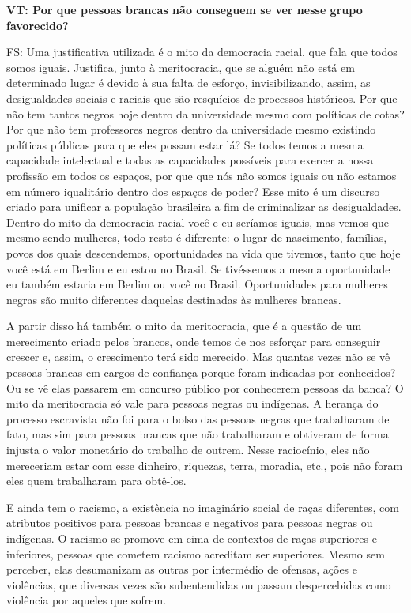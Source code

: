 \documentclass[a4paper,
fontsize=11pt,
oneside,
numbers=noperiodatend,
parskip=half-,
bibliography=totoc,
final
]{scrartcl}
\begin{document}
\textbf{VT: Por que pessoas brancas não conseguem se ver nesse grupo
favorecido?}

FS: Uma justificativa utilizada é o mito da democracia racial, que fala
que todos somos iguais. Justifica, junto à meritocracia, que se alguém
não está em determinado lugar é devido à sua falta de esforço,
invisibilizando, assim, as desigualdades sociais e raciais que são
resquícios de processos históricos. Por que não tem tantos negros hoje
dentro da universidade mesmo com políticas de cotas? Por que não tem
professores negros dentro da universidade mesmo existindo políticas
públicas para que eles possam estar lá? Se todos temos a mesma
capacidade intelectual e todas as capacidades possíveis para exercer a
nossa profissão em todos os espaços, por que que nós não somos iguais ou
não estamos em número iqualitário dentro dos espaços de poder? Esse mito
é um discurso criado para unificar a população brasileira a fim de
criminalizar as desigualdades. Dentro do mito da democracia racial você
e eu seríamos iguais, mas vemos que mesmo sendo mulheres, todo resto é
diferente: o lugar de nascimento, famílias, povos dos quais descendemos,
oportunidades na vida que tivemos, tanto que hoje você está em Berlim e
eu estou no Brasil. Se tivéssemos a mesma oportunidade eu também estaria
em Berlim ou você no Brasil. Oportunidades para mulheres negras são
muito diferentes daquelas destinadas às mulheres brancas.

A partir disso há também o mito da meritocracia, que é a questão de um
merecimento criado pelos brancos, onde temos de nos esforçar para
conseguir crescer e, assim, o crescimento terá sido merecido. Mas
quantas vezes não se vê pessoas brancas em cargos de confiança porque
foram indicadas por conhecidos? Ou se vê elas passarem em concurso
público por conhecerem pessoas da banca? O mito da meritocracia só vale
para pessoas negras ou indígenas. A herança do processo escravista não
foi para o bolso das pessoas negras que trabalharam de fato, mas sim
para pessoas brancas que não trabalharam e obtiveram de forma injusta o
valor monetário do trabalho de outrem. Nesse raciocínio, eles não
mereceriam estar com esse dinheiro, riquezas, terra, moradia, etc., pois
não foram eles quem trabalharam para obtê-los.

E ainda tem o racismo, a existência no imaginário social de raças
diferentes, com atributos positivos para pessoas brancas e negativos
para pessoas negras ou indígenas. O racismo se promove em cima de
contextos de raças superiores e inferiores, pessoas que cometem racismo
acreditam ser superiores. Mesmo sem perceber, elas desumanizam as outras
por intermédio de ofensas, ações e violências, que diversas vezes são
subentendidas ou passam despercebidas como violência por aqueles que
sofrem.
\end{document}
